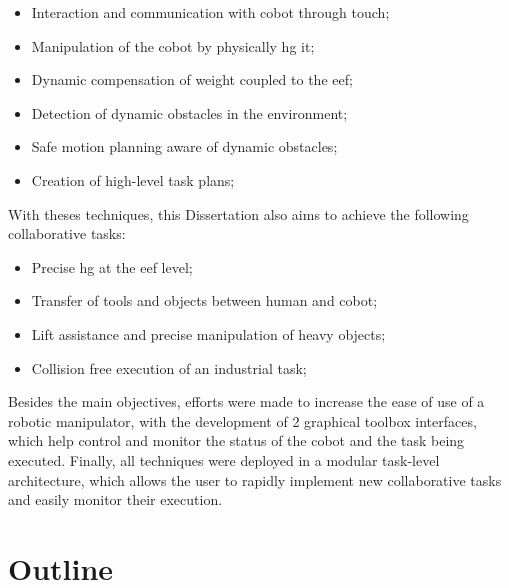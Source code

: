 
\begin{itemize}
    \item Interaction and communication with cobot through touch;
    \item Manipulation of the cobot by physically \ac{hg} it;
    \item Dynamic compensation of weight coupled to the \ac{eef};
    \item Detection of dynamic obstacles in the environment;
    \item Safe motion planning aware of dynamic obstacles;
    \item Creation of high-level task plans;
\end{itemize}

\par With theses techniques, this Dissertation also aims to achieve the following collaborative tasks:

\begin{itemize}
    \item Precise \ac{hg} at the \ac{eef} level;
    \item Transfer of tools and objects between human and cobot;
    \item Lift assistance and precise manipulation of heavy objects;
    \item Collision free execution of an industrial task;
\end{itemize}

\par Besides the main objectives, efforts were made to increase the ease of use of a robotic manipulator, with the development of 2 graphical toolbox interfaces, which help control and monitor the status of the cobot and the task being executed. Finally, all techniques were deployed in a modular task-level architecture, which allows the user to rapidly implement new collaborative tasks and easily monitor their execution.

\section{Outline}


